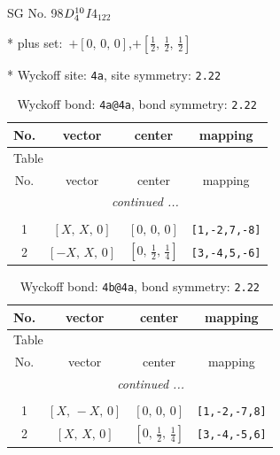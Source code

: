 \documentclass[fleqn,8pt]{jsarticle}
\begin{document}
\setcounter{MaxMatrixCols}{32}

\renewcommand{\tablename}{Table~}
\renewcommand{\figurename}{Figure~}
\begin{center}
\LARGE
SG No. 98\quad$D_{\rm 4}^{10}$\quad$I4_122$\quad[ tetragonal ]
\end{center}

* plus set:\,\,\,$+\left[ 0,\, 0,\, 0 \right]$,\quad $+\left[ \frac{1}{2},\, \frac{1}{2},\, \frac{1}{2} \right]$


* Wyckoff site: {\tt 4a}, site symmetry: {\tt 2.22}
\renewcommand{\arraystretch}{1.2}
\begin{longtable}{cccc}
\caption{Wyckoff bond: {\tt 4a@4a}, bond symmetry: {\tt 2.22}}
 \\
 \hline \hline
No. & vector & center & mapping \\ \hline \endfirsthead

\multicolumn{3}{l}{\tablename\ \thetable{}} \\
 \hline \hline
No. & vector & center & mapping \\ \hline \endhead

 \hline \hline
\multicolumn{3}{r}{\footnotesize\it continued ...} \\ \endfoot

 \hline \hline
\multicolumn{3}{r}{} \\ \endlastfoot

1 & $\left[ X,\, X,\, 0 \right]$ & $\left[ 0,\, 0,\, 0 \right]$ & {\tt [1,-2,7,-8]} \\ \hline
2 & $\left[ - X,\, X,\, 0 \right]$ & $\left[ 0,\, \frac{1}{2},\, \frac{1}{4} \right]$ & {\tt [3,-4,5,-6]} \\
\end{longtable}
\renewcommand{\arraystretch}{1.2}
\begin{longtable}{cccc}
\caption{Wyckoff bond: {\tt 4b@4a}, bond symmetry: {\tt 2.22}}
 \\
 \hline \hline
No. & vector & center & mapping \\ \hline \endfirsthead

\multicolumn{3}{l}{\tablename\ \thetable{}} \\
 \hline \hline
No. & vector & center & mapping \\ \hline \endhead

 \hline \hline
\multicolumn{3}{r}{\footnotesize\it continued ...} \\ \endfoot

 \hline \hline
\multicolumn{3}{r}{} \\ \endlastfoot

1 & $\left[ X,\, - X,\, 0 \right]$ & $\left[ 0,\, 0,\, 0 \right]$ & {\tt [1,-2,-7,8]} \\ \hline
2 & $\left[ X,\, X,\, 0 \right]$ & $\left[ 0,\, \frac{1}{2},\, \frac{1}{4} \right]$ & {\tt [3,-4,-5,6]} \\
\end{longtable}
\end{document}
